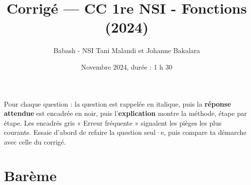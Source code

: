 \documentclass[addpoints, 11pt]{exam}
\title{Corrigé --- CC 1re NSI - Fonctions (2024)}
\author{Babash - NSI Tani Malandi et Johanne Bakalara}
\date{Novembre 2024, durée : 1 h 30}
\DeclareRobustCommand{\_}{\textunderscore\allowbreak}
\begin{document}
\pagestyle{headandfoot}
\firstpageheader{}{}{}

\maketitle
\thispagestyle{headandfoot}

\begin{astuce}
Pour chaque question : la question est rappelée en italique, puis la \textbf{réponse attendue} est encadrée en noir, puis l'\textbf{explication} montre la méthode, étape par étape.
Les encadrés gris « Erreur fréquente » signalent les pièges les plus courants. Essaie d'abord de refaire la question seul·e, puis compare ta démarche avec celle du corrigé.
\end{astuce}

\section*{Barème}
\begin{center}
  \gradetable[h]
\end{center}
\end{document}
